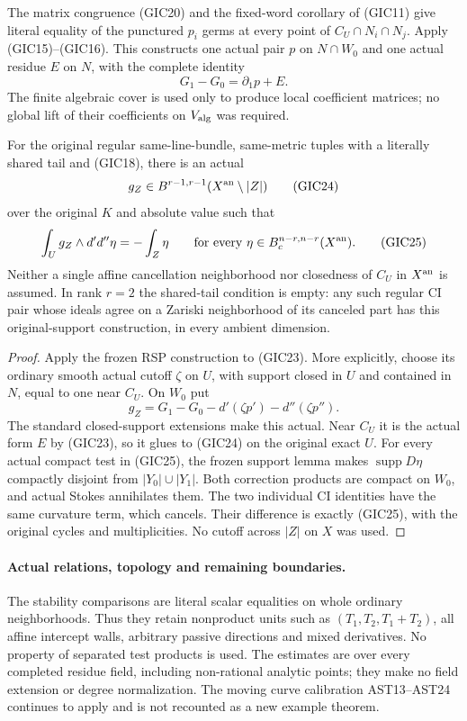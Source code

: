 The matrix congruence (GIC20) and the fixed-word corollary of
(GIC11) give literal equality of the punctured $p_i$ germs at
every point of $C_U\cap N_i\cap N_j$.  Apply (GIC15)--(GIC16).
This constructs one actual pair $p$ on $N\cap W_0$ and one
actual residue $E$ on $N$, with the complete identity
\[
                         G_1-G_0=\partial_1p+E.
 \tag{GIC23}
\]
The finite algebraic cover is used only to produce local
coefficient matrices; no global lift of their coefficients
on $V_{\rm alg}$ was required.

\begin{theorem}
For the original regular same-line-bundle, same-metric tuples
with a literally shared tail and (GIC18), there is an actual
\[
                  g_Z\in B^{r-1,r-1}
                          (X^{\rm an}\setminus|Z|)
 \tag{GIC24}
\]
over the original $K$ and absolute value such that
\[
       \int_Ug_Z\wedge d'd''\eta=-\int_Z\eta
           \qquad\text{for every }
                    \eta\in B_c^{n-r,n-r}(X^{\rm an}).
 \tag{GIC25}
\]
Neither a single affine cancellation neighborhood nor closedness
of $C_U$ in $X^{\rm an}$ is assumed.  In rank $r=2$ the
shared-tail condition is empty: any such regular CI pair whose
ideals agree on a Zariski neighborhood of its canceled part has
this original-support construction, in every ambient dimension.
\end{theorem}

\begin{proof}
Apply the frozen RSP construction to (GIC23).  More explicitly,
choose its ordinary smooth actual cutoff $\zeta$ on $U$, with
support closed in $U$ and contained in $N$, equal to one near
$C_U$.  On $W_0$ put
\[
      g_Z=G_1-G_0-d'(\zeta p')-d''(\zeta p'').
 \tag{GIC26}
\]
The standard closed-support extensions make this actual.
Near $C_U$ it is the actual form $E$ by (GIC23), so it
glues to (GIC24) on the original exact $U$.
For every actual compact test in (GIC25), the frozen support
lemma makes $\operatorname{supp}D\eta$ compactly disjoint
from $|Y_0|\cup|Y_1|$.  Both correction products are compact
on $W_0$, and actual Stokes annihilates them.  The two individual
CI identities have the same curvature term, which cancels.
Their difference is exactly (GIC25), with the original cycles
and multiplicities.  No cutoff across $|Z|$ on $X$ was used.
\end{proof}

\paragraph{Actual relations, topology and remaining boundaries.}
The stability comparisons are literal scalar equalities on whole
ordinary neighborhoods.  Thus they retain nonproduct units such
as $(T_1,T_2,T_1+T_2)$, all affine intercept walls, arbitrary
passive directions and mixed derivatives.  No property of
separated test products is used.  The estimates are over every
completed residue field, including non-rational analytic points;
they make no field extension or degree normalization.  The moving
curve calibration AST13--AST24 continues to apply and is not
recounted as a new example theorem.

